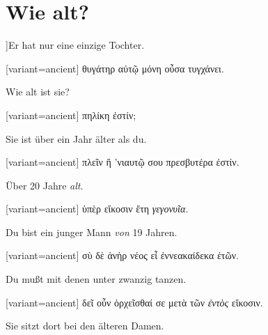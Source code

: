 \section{Wie alt?}

]Er hat nur eine einzige Tochter. 

\switchcolumn

\begin{greek}[variant=ancient]%
θυγάτηρ αὐτῷ μόνη οὖσα τυγχάνει.

\end{greek}%
\switchcolumn*

Wie alt ist sie? 

\switchcolumn

\begin{greek}[variant=ancient]%
πηλίκη ἐστίν;

\end{greek}%
\switchcolumn*

Sie ist über ein Jahr älter als du. 

\switchcolumn

\begin{greek}[variant=ancient]%
πλεῖν ἢ 'νιαυτῷ σου πρεσβυτέρα ἐστίν.

\end{greek}%
\switchcolumn*

Über 20 Jahre \emph{alt}. 

\switchcolumn

\begin{greek}[variant=ancient]%
ὑπὲρ εἴκοσιν ἔτη \emph{γεγονυῖα.}

\end{greek}%
\switchcolumn*

Du bist ein junger Mann \emph{von} 19 Jahren.

\switchcolumn

\begin{greek}[variant=ancient]%
σὺ δὲ ἀνὴρ νέος εἶ ἐννεακαίδεκα ἐτῶν.

\end{greek}%
\switchcolumn*

Du mußt mit denen unter zwanzig tanzen. 

\switchcolumn

\begin{greek}[variant=ancient]%
δεῖ οὖν ὀρχεῖσθαί σε μετὰ τῶν \emph{ἐντὸς} εἴκοσιν.

\end{greek}%
\switchcolumn*

Sie sitzt dort bei den älteren Damen. 

